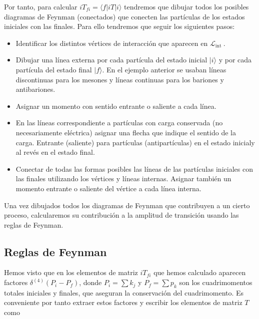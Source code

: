Por tanto, para calcular $i T_{f i}=\langle f| i T|i\rangle$ tendremos que dibujar todos los posibles diagramas de Feynman (conectados) que conecten las partículas de los estados iniciales con las finales. Para ello tendremos que seguir los siguientes pasos:
\begin{itemize}
  \item Identificar los distintos vértices de interacción que aparecen en $\mathscr{L}_{\text {int }}$. 

\item Dibujar una línea externa por cada partícula del estado inicial $|i\rangle$ y por cada partícula del estado final $|f\rangle$. En el ejemplo anterior se usaban líneas discontinuas para los mesones y líneas continuas para los bariones y antibariones.
\item Asignar un momento con sentido entrante o saliente a cada línea.
\item En las líneas correspondiente a partículas con carga conservada (no necesariamente eléctrica) asignar una flecha que indique el sentido de la carga. Entrante (saliente) para partículas (antipartículas) en el estado inicialy al revés en el estado final.
\item Conectar de todas las formas posibles las líneas de las partículas iniciales con las finales utilizando los vértices y líneas internas. Asignar también un momento entrante o saliente del vértice a cada línea interna.
\end{itemize}

Una vez dibujados todos los diagramas de Feynman que contribuyen a un cierto proceso, calcularemos su contribución a la amplitud de transición usando las reglas de Feynman.

\subsection*{Reglas de Feynman}

Hemos visto que en los elementos de matriz $i T_{f i}$ que hemos calculado aparecen factores $\delta^{(4)}\left(P_{i}-P_{f}\right)$, donde $P_{i}=\sum k_{j}$ y $P_{f}=\sum p_{k}$ son los cuadrimomentos totales iniciales y finales, que aseguran la conservación del cuadrimomento. Es conveniente por tanto extraer
estos factores y escribir los elementos de matriz $T$ como

